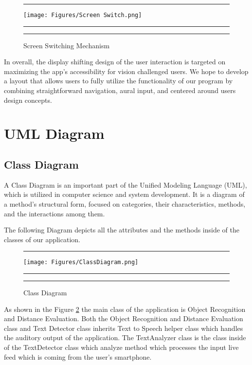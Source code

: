 \documentclass[MScCS]{uccthesis}
\begin{document}
\begin{figure}[H]
      \hrule
      \vspace{0.5em}
     \centering
      \texttt{[image: Figures/Screen Switch.png]}
      \vspace{0.5em}
      \hrule
      \vspace{0.5em}
      \caption{\centering\label{fig:SS}Screen Switching Mechanism}
      \vspace{0.5em}
      \hrule
   \end{figure}
   In overall, the display shifting design of the user interaction is targeted on maximizing the app's accessibility for vision challenged users. We hope to develop a layout that allows users to fully utilize the functionality of our program by combining straightforward navigation, aural input, and centered around users design concepts.



   \section{UML Diagram}

   \subsection{Class Diagram}
   A Class Diagram is an important part of the Unified Modeling Language (UML), which is utilized in computer science and system development. It is a diagram of a method's structural form, focused on categories, their characteristics, methods, and the interactions among them.

   The following Diagram depicts all the attributes and the methods inside of the classes of our application.
\begin{figure}[H]
      \hrule
      \vspace{0.5em}
     \centering
      \texttt{[image: Figures/ClassDiagram.png]}
      \vspace{0.5em}
      \hrule
      \caption{\centering\label{fig:CD}Class Diagram}
      \vspace{0.5em}
      \hrule
   \end{figure}

 As shown in the Figure \ref{fig:CD} the main class of the application is Object Recognition and Distance Evaluation. Both the Object Recognition and Distance Evaluation class and Text Detector class inherits Text to Speech helper class which handles the auditory output of the application. The TextAnalyzer class is the class inside of the TextDetector class which analyze method which processes the input live feed which is coming from the user's smartphone.
\end{document}
